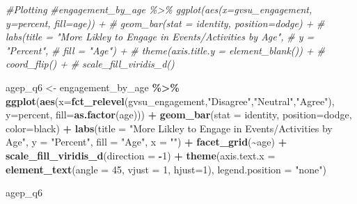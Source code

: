 \documentclass[
]{article}
\newenvironment{Shaded}{\begin{snugshade}}{\end{snugshade}}
\newcommand{\AttributeTok}[1]{\textcolor[rgb]{0.13,0.29,0.53}{#1}}
\newcommand{\CommentTok}[1]{\textcolor[rgb]{0.56,0.35,0.01}{\textit{#1}}}
\newcommand{\DecValTok}[1]{\textcolor[rgb]{0.00,0.00,0.81}{#1}}
\newcommand{\FunctionTok}[1]{\textcolor[rgb]{0.13,0.29,0.53}{\textbf{#1}}}
\newcommand{\NormalTok}[1]{#1}
\newcommand{\OtherTok}[1]{\textcolor[rgb]{0.56,0.35,0.01}{#1}}
\newcommand{\SpecialCharTok}[1]{\textcolor[rgb]{0.81,0.36,0.00}{\textbf{#1}}}
\newcommand{\StringTok}[1]{\textcolor[rgb]{0.31,0.60,0.02}{#1}}
\begin{document}
\begin{Shaded}
\begin{Highlighting}[]
\CommentTok{\#Plotting}
\CommentTok{\#engagement\_by\_age \%\textgreater{}\% ggplot(aes(x=gvsu\_engagement, y=percent, fill=age)) +}
\CommentTok{\#  geom\_bar(stat = \textquotesingle{}identity\textquotesingle{}, position=\textquotesingle{}dodge\textquotesingle{}) +}
\CommentTok{\#  labs(title = "More Likley to Engage in Events/Activities by Age",}
\CommentTok{\#       y = "Percent",}
\CommentTok{\#       fill = "Age") +}
\CommentTok{\#  theme(axis.title.y = element\_blank()) +}
\CommentTok{\#  coord\_flip() +}
\CommentTok{\#  scale\_fill\_viridis\_d()}

\NormalTok{agep\_q6 }\OtherTok{\textless{}{-}}\NormalTok{ engagement\_by\_age }\SpecialCharTok{\%\textgreater{}\%} \FunctionTok{ggplot}\NormalTok{(}\FunctionTok{aes}\NormalTok{(}\AttributeTok{x=}\FunctionTok{fct\_relevel}\NormalTok{(gvsu\_engagement,}\StringTok{"Disagree"}\NormalTok{,}\StringTok{"Neutral"}\NormalTok{,}\StringTok{"Agree"}\NormalTok{), }
                                 \AttributeTok{y=}\NormalTok{percent, }\AttributeTok{fill=}\FunctionTok{as.factor}\NormalTok{(age))) }\SpecialCharTok{+}
  \FunctionTok{geom\_bar}\NormalTok{(}\AttributeTok{stat =} \StringTok{\textquotesingle{}identity\textquotesingle{}}\NormalTok{, }\AttributeTok{position=}\StringTok{\textquotesingle{}dodge\textquotesingle{}}\NormalTok{, }\AttributeTok{color=}\StringTok{\textquotesingle{}black\textquotesingle{}}\NormalTok{) }\SpecialCharTok{+}
  \FunctionTok{labs}\NormalTok{(}\AttributeTok{title =} \StringTok{"More Likley to Engage in Events/Activities by Age"}\NormalTok{,}
      \AttributeTok{y =} \StringTok{"Percent"}\NormalTok{,}
      \AttributeTok{fill =} \StringTok{"Age"}\NormalTok{,}
      \AttributeTok{x =} \StringTok{""}\NormalTok{) }\SpecialCharTok{+}
  \FunctionTok{facet\_grid}\NormalTok{(}\SpecialCharTok{\textasciitilde{}}\NormalTok{age) }\SpecialCharTok{+}
  \FunctionTok{scale\_fill\_viridis\_d}\NormalTok{(}\AttributeTok{direction =} \SpecialCharTok{{-}}\DecValTok{1}\NormalTok{) }\SpecialCharTok{+}
  \FunctionTok{theme}\NormalTok{(}\AttributeTok{axis.text.x =} \FunctionTok{element\_text}\NormalTok{(}\AttributeTok{angle =} \DecValTok{45}\NormalTok{, }\AttributeTok{vjust =} \DecValTok{1}\NormalTok{, }\AttributeTok{hjust=}\DecValTok{1}\NormalTok{),}
        \AttributeTok{legend.position =} \StringTok{"none"}\NormalTok{)}

\NormalTok{agep\_q6}
\end{Highlighting}
\end{Shaded}
\end{document}

